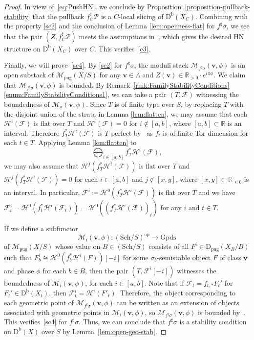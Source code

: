 \documentclass[11pt, reqno]{amsart}
\numberwithin{equation}{section}
\theoremstyle{plain}
\theoremstyle{remark}
\theoremstyle{definition}
\theoremstyle{italicsname}
\newcommand{\bv}{\mathbf{v}}
\newcommand{\Db}{\mathrm{D^b}}
\newcommand{\Dpug}{\mathrm{D_{pug}}}
\newcommand{\cF}{\mathcal{F}}
\newcommand{\cH}{\mathcal{H}}
\newcommand{\cM}{\mathcal{M}}
\newcommand{\cP}{\mathscr{P}}
\def\RR{\ensuremath{\mathbb{R}}}
\def\citestacks#1{\cite[\href{https://stacks.math.columbia.edu/tag/#1}{#1}]{stacks-project}}
\begin{document}
\begin{proof}
In view of~\eqref{eq:PushHN}, we conclude by Proposition~\ref{proposition-pullback-stability} that the pullback $f^{\sharp}_{C} \cP$ is a $C$-local slicing of $\Db(X_C)$. 
Combining with the property \ref{sc2} and the conclusion of Lemma \ref{lem:openness-flat} for $f^{\sharp}{\sigma}$, 
we see that the pair $(Z, f_C^{\sharp}\cP)$ meets the assumptions in~\cite[Theorem 18.7]{stability-families}, which gives the desired HN structure on $\Db(X_C)$ over $C$. This verifies~\ref{c3}.

Finally, we will prove~\ref{sc4}. 
By \ref{sc2} for $f^{\sharp}{\sigma}$, the moduli stack $\cM_{f^{\sharp}{\sigma}}(\bv,\phi)$ is an open substack of $\cM_{\mathrm{pug}}(X/S)$ for any $\bv\in \Lambda$ and $Z(\bv)\in \RR_{>0}\cdot e^{i\pi\phi}$. 
We claim that $\cM_{f^{\sharp}{\sigma}}(\bv,\phi)$ is bounded. 
By Remark~\ref{rmk:FamilyStabilityConditions}\eqref{enum:FamilyStabilityConditions1}, we can take a pair $(T, \cF)$ witnessing the boundedness of $\cM_{{\sigma}}(\bv,\phi)$. 
Since $T$ is of finite type over $S$, by replacing $T$ with the disjoint union of the strata in Lemma \ref{lem:flatten}, we may assume that each $\cH^i(\cF)$ is flat over $T$ and $\cH^i(\cF)=0$ for $i\notin [a,b]$, where $[a,b]\subset \RR$ is an interval. 
Therefore $f^*_T\cH^{i}(\cF)$ is $T$-perfect by~\citestacks{0GEH} as $f_t$ is of finite Tor dimension for each $t\in T$. 
Applying Lemma \ref{lem:flatten} to
\[
\bigoplus_{i\in [a,b]}f^*_T\cH^{i}(\cF),
\]
we may also assume that $\cH^j(f^*_T\cH^{i}(\cF))$ is flat over $T$ and $\cH^j(f^*_T\cH^{i}(\cF))=0$ for each $i\in [a,b]$ and $j\notin [x,y]$, where $[x,y]\subset \RR_{\leq 0}$ is an interval. 
In particular, $\cF^i\coloneqq \cH^0(f_T^*\cH^i(\cF))$ is flat over $T$ and we have $\cF^i_t=\cH^0(f_t^*\cH^i(\cF_t))=\cH^0((f_T^*\cH^i(\cF))_t)$ for any $i$ and $t\in T$. 

If we define a subfunctor
\[
\cM_i(\bv,\phi)\colon (\mathrm{Sch}/S)^{\mathrm{op}}\to \mathrm{Gpds}
\]
of $\cM_{\mathrm{pug}}(X/S)$ whose value on $B\in (\mathrm{Sch}/S)$ consists of all $F^i\in\Dpug(X_B/B)$ such that $F_b^i\cong\cH^0(f_b^*\cH^i(F))[-i]$ for some $\sigma_b$-semistable object $F$ of class $\bv$ and phase $\phi$ for each $b\in B$, then the pair $(T,\cF^i[-i])$ witnesses the boundedness of $\cM_i(\bv,\phi)$, for each $i\in [a,b]$. 
Note that if $\cF_t=f_{t,*}F_t'$ for $F_t'\in \Db(X_t)$, then $\cF^i_t=\cH^i(F'_t)$. 
Therefore, the object corresponding to each geometric point of $\cM_{f^{\sharp}{\sigma}}(\bv,\phi)$ can be written as an extension of objects associated with geometric points in $\cM_i(\bv,\phi)$, so $\cM_{f^{\sharp}{\sigma}}(\bv,\phi)$ is bounded by~\cite[Lemma 9.6]{stability-families}. 
This verifies~\ref{sc4} for $f^{\sharp}\sigma$. 
Thus, we can conclude that $f^{\sharp}{\sigma}$ is a stability condition on $\Db(X)$ over $S$ by Lemma~\ref{lem:open-geo-stab}.


\end{proof}
\end{document}

